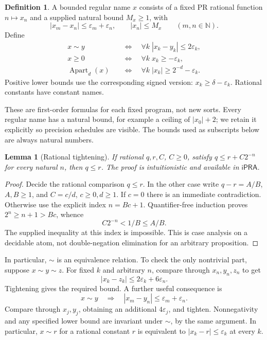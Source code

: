 \documentclass[11pt,a4paper]{article}
\newtheorem{lemma}[theorem]{Lemma}
\theoremstyle{definition}
\newtheorem{definition}[theorem]{Definition}
\newcommand{\ipra}{\mathsf{iPRA}}
\newcommand{\N}{\mathbb N}
\newcommand{\eps}{\varepsilon}
\newcommand{\abs}[1]{\left|#1\right|}
\newcommand{\Apart}{\operatorname{Apart}}
\numberwithin{equation}{section}
\begin{document}
\begin{definition}
A bounded regular name \(x\) consists of a fixed PR rational function
\(n\mapsto x_n\) and a supplied natural bound \(M_x\ge1\), with
\[
 \abs{x_m-x_n}\le\eps_m+\eps_n,\qquad
 \abs{x_n}\le M_x\qquad(m,n\in\N).
 \tag{3.1}\label{eq:regular}
\]
Define
\setcounter{equation}{1}
\begin{align}
 x\sim y&\quad\Longleftrightarrow\quad
      \forall k\;\abs{x_k-y_k}\le2\eps_k,\label{eq:name-eq}\\
 x\ge0&\quad\Longleftrightarrow\quad
      \forall k\;x_k\ge-\eps_k,\label{eq:name-positive}\\
 \Apart_d(x)&\quad\Longleftrightarrow\quad
      \forall k\;\abs{x_k}\ge2^{-d}-\eps_k.\label{eq:name-apart}
\end{align}
Positive lower bounds use the corresponding signed version:
\(x_k\ge\delta-\eps_k\). Rational constants have constant names.
\end{definition}

These are first-order formulas for each fixed program, not new sorts.
Every regular name has a natural bound, for example a ceiling of
\(\abs{x_0}+2\); we retain it explicitly so precision schedules are
visible. The bounds used as subscripts below are always natural numbers.

\begin{lemma}[Rational tightening]\label{lem:tighten}
If rational \(q,r,C\), \(C\ge0\), satisfy
\(q\le r+C2^{-n}\) for every natural \(n\), then \(q\le r\).
The proof is intuitionistic and available in \(\ipra\).
\end{lemma}

\begin{proof}
Decide the rational comparison \(q\le r\). In the other case write
\(q-r=A/B\), \(A,B\ge1\), and \(C=c/d\), \(c\ge0,d\ge1\).
If \(c=0\) there is an immediate contradiction. Otherwise use the
explicit index \(n=Bc+1\). Quantifier-free induction proves
\(2^n\ge n+1>Bc\), whence
\[
 C2^{-n}<1/B\le A/B.
\]
The supplied inequality at this index is impossible. This is
case analysis on a decidable atom, not double-negation elimination
for an arbitrary proposition.
\end{proof}

In particular, \(\sim\) is an equivalence relation. To check the
only nontrivial part, suppose \(x\sim y\sim z\). For fixed \(k\)
and arbitrary \(n\), compare through \(x_n,y_n,z_n\) to get
\[
 \abs{x_k-z_k}\le2\eps_k+6\eps_n.
\]
Tightening gives the required bound. A further useful consequence is
\[
 x\sim y\quad\Longrightarrow\quad
 \abs{x_m-y_n}\le\eps_m+\eps_n.
 \tag{3.5}\label{eq:cross}
\]
Compare through \(x_j,y_j\), obtaining an additional \(4\eps_j\),
and tighten. Nonnegativity and any specified lower bound are invariant
under \(\sim\), by the same argument. In particular,
\(x\sim r\) for a rational constant \(r\) is equivalent to
\(\abs{x_k-r}\le\eps_k\) at every \(k\).
\end{document}
